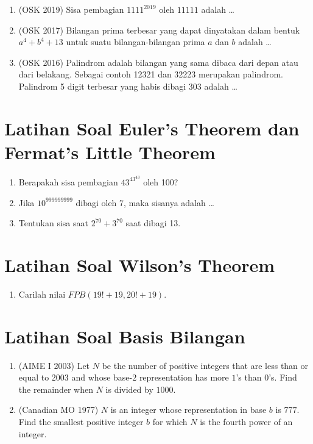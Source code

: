 \documentclass[12pt]{scrartcl}
\begin{document}
\begin{enumerate}
    \item (OSK 2019) Sisa pembagian $1111^{2019}$ oleh $11111$ adalah \ldots

    \item (OSK 2017) Bilangan prima terbesar yang dapat dinyatakan dalam bentuk $a^4+b^4+13$ untuk suatu bilangan-bilangan prima $a$ dan $b$ adalah \ldots

    \item (OSK 2016) Palindrom adalah bilangan yang sama dibaca dari depan atau dari belakang. Sebagai contoh 12321 dan 32223 merupakan palindrom. Palindrom 5 digit terbesar yang habis dibagi 303 adalah \ldots
\end{enumerate}

\section{Latihan Soal Euler's Theorem dan Fermat's Little Theorem}
\begin{enumerate}
    \item Berapakah sisa pembagian $43^{43^{43}}$ oleh 100?
    
    \item Jika $10^{999999999}$ dibagi oleh 7, maka sisanya adalah \dots
    
    \item Tentukan sisa saat $2^{70}+3^{70}$ saat dibagi 13.
\end{enumerate}

\section{Latihan Soal Wilson's Theorem}
\begin{enumerate}
    \item Carilah nilai $FPB(19!+19,20!+19).$
\end{enumerate}



\section{Latihan Soal Basis Bilangan}
\begin{enumerate}
    \item (AIME I 2003) Let $N$ be the number of positive integers that are less than or equal to $2003$ and whose base-$2$ representation has more $1$'s than $0$'s. Find the remainder when $N$ is divided by $1000$.

    \item (Canadian MO 1977) $N$ is an integer whose representation in base $b$ is $777.$ Find the smallest positive integer $b$ for which $N$ is the fourth power of an integer.
\end{enumerate}
\end{document}

